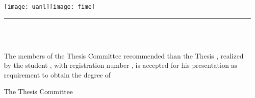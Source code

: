 {\renewcommand{\baselinestretch}{1.1}\selectfont
\begin{center}\vspace*{-25mm}\hspace*{-10mm}
\begin{minipage}{170.5mm}
\hspace{-1.5mm}\texttt{[image: uanl]}\hfill{}\hbox{\texttt{[image: fime]}}
\hrule\vspace{0.5mm}
\scalebox{.5}{\MakeUppercase{\uanl}}\hfill\scalebox{.5}{\MakeUppercase{\fime}}\medskip
\end{minipage}
\vskip4mm{\sc\large\uanl\\\fime\\[3pt]\depg}\vskip6mm
\end{center}

The members of the Thesis Committee recommended than the Thesis \textit{\tituloEng}, realized by the student \autor, with registration number \matricula, is accepted for his presentation as requirement to obtain the degree of \grado\orientacion
\ifdoctorado\vskip10mm\else\vskip8mm\fi

\begin{center}
The Thesis Committee\\
\ifdoctorado\vskip15mm\else\vskip25mm\fi


\end{center}}
